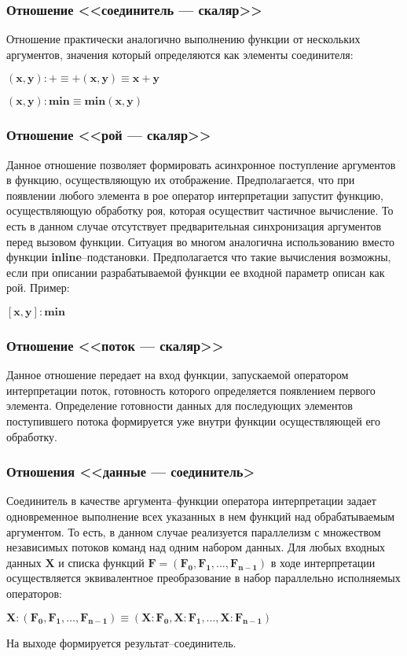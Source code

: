 \subsubsection{Отношение <<соединитель --- скаляр>>}

Отношение практически аналогично выполнению функции от нескольких аргументов, значения который определяются как элементы соединителя:
\begin{center}
	$\mathbf{(x, y):+ \equiv +(x, y) \equiv x + y}$
	
	$\mathbf{(x, y):min \equiv min(x, y)}$
\end{center}

\subsubsection{Отношение <<рой --- скаляр>>}

Данное отношение позволяет формировать асинхронное поступление аргументов в функцию, осуществляющую их отображение. Предполагается, что при появлении любого элемента в рое оператор интерпретации запустит функцию, осуществляющую обработку роя, которая осуществит частичное вычисление. То есть в данном случае отсутствует предварительная синхронизация аргументов перед вызовом функции. Ситуация во многом аналогична использованию вместо функции \textbf{inline}--подстановки. Предполагается что такие вычисления возможны, если при описании разрабатываемой функции ее входной параметр описан как рой. Пример:
\begin{center}
	$\mathbf{[x, y]:min}$
\end{center}

\subsubsection{Отношение <<поток --- скаляр>>}

Данное отношение передает на вход функции, запускаемой оператором интерпретации поток, готовность которого определяется появлением первого элемента. Определение готовности данных для последующих элементов поступившего потока формируется уже внутри функции осуществляющей его обработку.

\subsubsection{Отношения <<данные --- соединитель>}

Соединитель в качестве аргумента--функции оператора интерпретации задает одновременное выполнение всех указанных в нем функций над обрабатываемым аргументом. То есть, в данном случае реализуется параллелизм с множеством независимых потоков команд над одним набором данных. Для любых входных данных $\mathbf{X}$ и списка функций $\mathbf{F=(F_0,F_1,..., F_{n-1})}$ в ходе интерпретации осуществляется эквивалентное преобразование в набор параллельно исполняемых операторов:
\begin{center}
	$\mathbf{X:(F_0,F_1,..., F_{n-1}) \equiv (X:F_0,X:F_1,..., X:F_{n-1})}$
\end{center}
На выходе формируется результат--соединитель.

